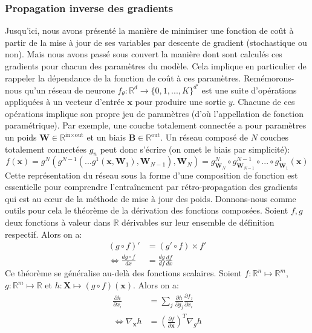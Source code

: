 \subsubsection{Propagation inverse des gradients}
Jusqu'ici, nous avons présenté la manière de minimiser une fonction de coût à partir de la mise à jour de ses variables par descente de gradient (stochastique ou non). Mais nous avons passé sous couvert la manière dont sont calculés ces gradients pour chacun des paramètres du modèle. Cela implique en particulier de rappeler la dépendance de la fonction de coût à ces paramètres. Remémorons-nous qu'un réseau de neurone $f_\theta: \mathbb{R}^d \to \{0,1,...,K\}^{d'}$ est une suite d'opérations appliquées à un vecteur d'entrée $\mathbf{x}$ pour produire une sortie $y$. Chacune de ces opérations implique son propre jeu de paramètres (d'où l'appellation de fonction paramétrique). Par exemple, une couche totalement connectée a pour paramètres un poids $\mathbf{W} \in \mathbb{R}^{\text{in} \times \text{out}}$ et un biais $\mathbf{B} \in \mathbb{R}^{\text{out}}$. Un réseau composé de $N$ couches totalement connectées $g_n$ peut donc s'écrire (on omet le biais par simplicité):
\begin{equation}
	\label{eq:simpleFeedForward}
	f(\mathbf{x}) = g^N(g^{N-1}(...g^1(\mathbf{x}, \mathbf{W}_{1}), \mathbf{W}_{N-1}), \mathbf{W}_N) = g_{\mathbf{W}_N}^N \circ g_{\mathbf{W}_{N-1}}^{N-1} \circ ... \circ g_{\mathbf{W}_1}^1 (\mathbf{x})
\end{equation}
Cette représentation du réseau sous la forme d'une composition de fonction est essentielle pour comprendre l'entraînement par rétro-propagation des gradients qui est au cœur de la méthode de mise à jour des poids. Donnons-nous comme outils pour cela le théorème de la dérivation des fonctions composées.
Soient $f, g$ deux fonctions à valeur dans $\mathbb{R}$ dérivables sur leur ensemble de définition respectif. Alors on a:
\begin{align}
	(g\circ f)' &= (g' \circ f) \times f' \\
	\Leftrightarrow \frac{d g \circ f}{dx} &= \frac{dg}{df}\frac{df}{dx} 
\end{align}
Ce théorème se généralise au-delà des fonctions scalaires. Soient $f: \mathbb{R}^n \mapsto \mathbb{R}^m$, $g:\mathbb{R}^m \mapsto \mathbb{R}$ et $h: \mathbf{X} \mapsto (g \circ f)(\mathbf{x})$. Alors on a:
\begin{align}
	\label{eq:GradientRuleComposition}
	\frac{\partial h}{\partial x_i} &= \sum_j \frac{\partial h}{\partial g_j}\frac{\partial f_j}{\partial x_i} \\
	\Leftrightarrow \nabla_{\mathbf{x}} h &= \left(\frac{\partial f}{\partial \mathbf{x}}\right)^T \nabla_{g} h
\end{align}
